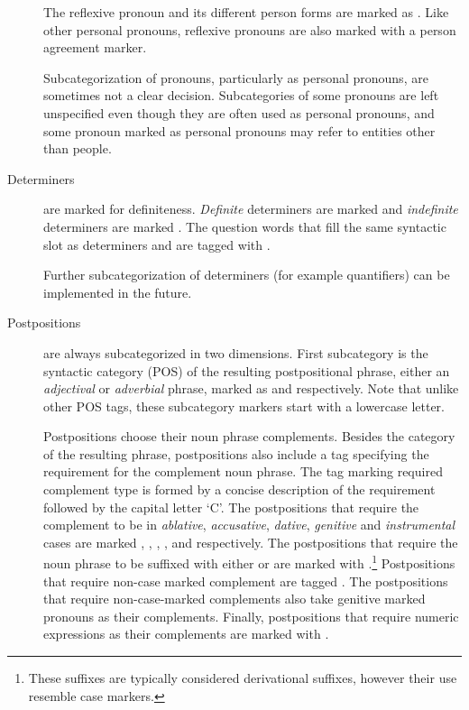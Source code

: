 \documentclass[twocolumn]{article}
\begin{document}
\begin{description}
The reflexive pronoun  and its different person forms are
marked as . Like other personal pronouns,
reflexive pronouns are also marked with a person agreement marker.

Subcategorization of pronouns, particularly as personal pronouns, are
sometimes not a clear decision. Subcategories of some pronouns are
left unspecified even though they are often used as personal
pronouns, and some pronoun marked as personal pronouns may refer to
entities other than people.

\item[Determiners] are marked for definiteness. 
\emph{Definite} determiners are marked  and
\emph{indefinite} determiners are marked . The question
words that fill the same syntactic slot as determiners  and
 are tagged with . 

Further subcategorization of determiners (for example 
quantifiers) can be implemented in the future.

\item[Postpositions] are always subcategorized in two dimensions.
First subcategory is the syntactic category (POS) of the resulting
postpositional phrase, either an \emph{adjectival} or \emph{adverbial}
phrase, marked as  and 
respectively. Note that unlike other POS tags, these subcategory
markers start with a lowercase letter.

Postpositions choose their noun phrase complements.  Besides the
category of the resulting phrase, postpositions also include a tag
specifying the requirement for the complement noun phrase. The tag
marking required complement type is formed by a concise
description of the requirement followed by the capital letter `C'. The
postpositions that require the complement to be in \emph{ablative},
\emph{accusative}, \emph{dative}, \emph{genitive} and \emph{instrumental} cases are marked 
,
,
,
,
and  respectively. The
postpositions that require the noun phrase to be suffixed with either
 or  are marked with
.\footnote{These suffixes are typically considered derivational suffixes, 
however their use resemble case markers.}
Postpositions that require
non-case marked complement are tagged . The
postpositions that require non-case-marked complements also take
genitive marked pronouns as their complements. Finally, postpositions that require numeric expressions as their
complements are marked with .


\end{description}
\end{document}
